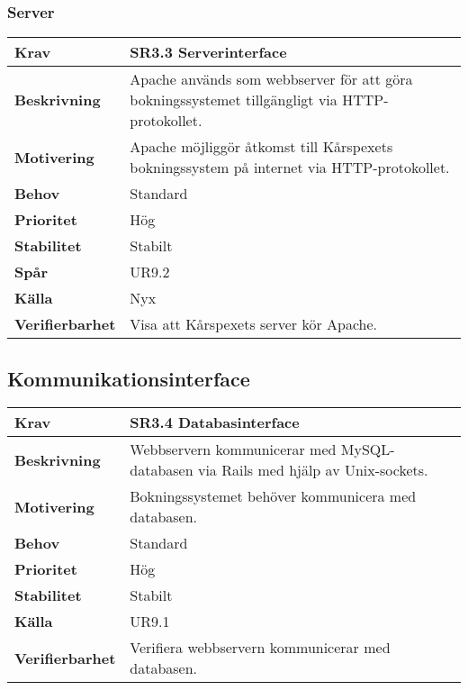 \documentclass[a4paper, twoside, 11pt, titlepage]{article}
\begin{document}
		\subsubsection{Server}


		\begin{tabular} { p{2.6cm} p{12.5cm} }
			\hline
			\sffamily\textbf{Krav} & \sffamily\textbf{SR3.3 Serverinterface } \\
			\hline
			\sffamily\textbf{Beskrivning} & Apache används som webbserver för att göra bokningssystemet tillgängligt via HTTP-protokollet.  \\
			\hline
			\sffamily\textbf{Motivering} & Apache möjliggör åtkomst till Kårspexets bokningssystem på internet via HTTP-protokollet.  \\
			\hline
			\sffamily\textbf{Behov} & Standard  \\
			\hline
			\sffamily\textbf{Prioritet} & Hög  \\
			\hline
			\sffamily\textbf{Stabilitet} & Stabilt  \\
			\hline
			\sffamily\textbf{Spår} & UR9.2  \\
			\hline
			\sffamily\textbf{Källa} & Nyx  \\
			\hline
			\sffamily\textbf{Verifierbarhet} & Visa att Kårspexets server kör Apache.  \\
			\hline
		\end{tabular}


	\subsection{Kommunikationsinterface}


	\begin{tabular} { p{2.6cm} p{12.5cm} }
		\hline
		\sffamily\textbf{Krav} & \sffamily\textbf{SR3.4 Databasinterface } \\
		\hline
		\sffamily\textbf{Beskrivning} & Webbservern kommunicerar med MySQL-databasen via Rails med hjälp av Unix-sockets.  \\
		\hline
		\sffamily\textbf{Motivering} & Bokningssystemet behöver kommunicera med databasen.  \\
		\hline
		\sffamily\textbf{Behov} & Standard  \\
		\hline
		\sffamily\textbf{Prioritet} & Hög  \\
		\hline
		\sffamily\textbf{Stabilitet} & Stabilt  \\
		\hline
		\sffamily\textbf{Källa} & UR9.1  \\
		\hline
		\sffamily\textbf{Verifierbarhet} & Verifiera webbservern kommunicerar med databasen.  \\
		\hline
	\end{tabular}
\end{document}
